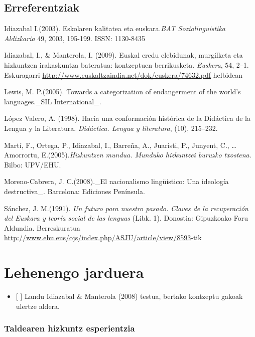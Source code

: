 \documentclass[]{book}
\providecommand{\tightlist}{%
  \setlength{\itemsep}{0pt}\setlength{\parskip}{0pt}}
\begin{document}
\hypertarget{erreferentziak}{%
\section{Erreferentziak}\label{erreferentziak}}

Idiazabal I.(2003). Eskolaren kalitatea eta euskara.\emph{BAT Soziolinguistika Aldizkaria} 49, 2003, 195-199. ISSN: 1130-8435

Idiazabal, I., \& Manterola, I. (2009). Euskal eredu elebidunak, murgilketa eta hizkuntzen irakaskuntza bateratua: kontzeptuen berrikusketa. \emph{Euskera}, 54, 2--1. Eskuragarri \url{http://www.euskaltzaindia.net/dok/euskera/74632.pdf} helbidean

Lewis, M. P.(2005). Towards a categorization of endangerment of the world's languages.\_SIL International\_.

López Valero, A. (1998). Hacia una conformación histórica de la Didáctica de la Lengua y la Literatura. \emph{Didáctica. Lengua y literatura}, (10), 215--232.

Martí, F., Ortega, P., Idiazabal, I., Barreña, A., Juaristi, P., Junyent, C., \ldots{} Amorrortu, E.(2005).\emph{Hizkuntzen mundua. Munduko hizkuntzei buruzko txostena}. Bilbo: UPV/EHU.

Moreno-Cabrera, J. C.(2008).\_El nacionalismo lingüístico: Una ideología destructiva\_. Barcelona: Ediciones Península.

Sánchez, J. M.(1991). \emph{Un futuro para nuestro pasado. Claves de la recuperación del Euskara y teoría social de las lenguas} (Libk. 1). Donostia: Gipuzkoako Foru Aldundia. Berreskuratua \href{http://www.ehu.eus/ojs/index.php/ASJU/article/view/8593-\%28e\%29tik}{http://www.ehu.eus/ojs/index.php/ASJU/article/view/8593}-tik

\hypertarget{lehenengo-jarduera}{%
\chapter*{Lehenengo jarduera}\label{lehenengo-jarduera}}

\begin{itemize}
\tightlist
\item
  {[} {]} Landu Idiazabal \& Manterola (2008) testua, bertako kontzeptu gakoak ulertze aldera.
\end{itemize}

\hypertarget{taldearen-hizkuntz-esperientzia}{%
\subsection{Taldearen hizkuntz esperientzia}\label{taldearen-hizkuntz-esperientzia}}
\end{document}
